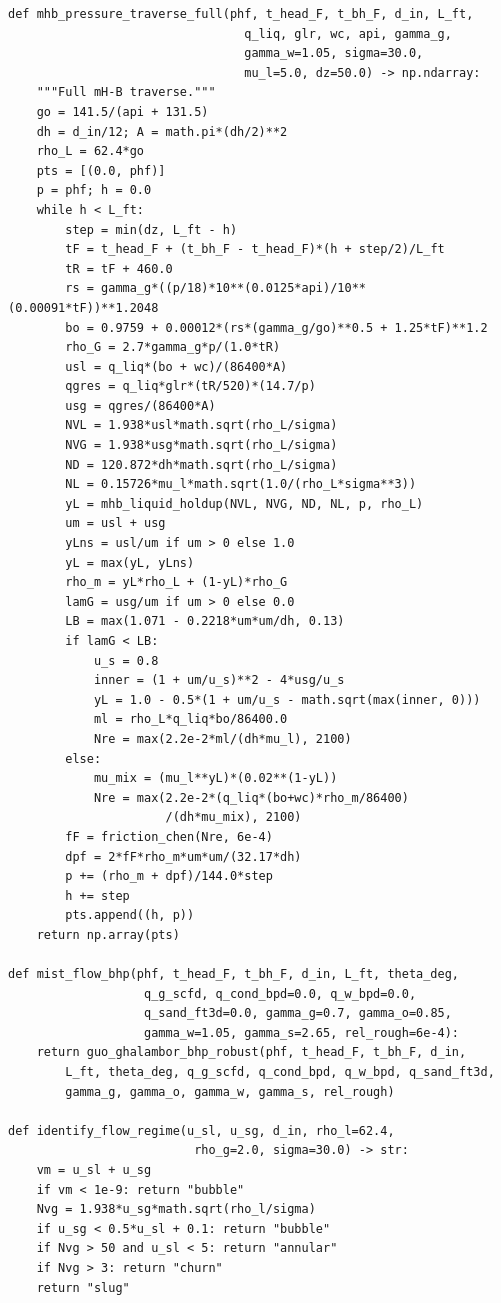 \documentclass[10pt,a4paper,openany]{book}
\begin{document}
\begin{lstlisting}
def mhb_pressure_traverse_full(phf, t_head_F, t_bh_F, d_in, L_ft,
                                 q_liq, glr, wc, api, gamma_g,
                                 gamma_w=1.05, sigma=30.0,
                                 mu_l=5.0, dz=50.0) -> np.ndarray:
    """Full mH-B traverse."""
    go = 141.5/(api + 131.5)
    dh = d_in/12; A = math.pi*(dh/2)**2
    rho_L = 62.4*go
    pts = [(0.0, phf)]
    p = phf; h = 0.0
    while h < L_ft:
        step = min(dz, L_ft - h)
        tF = t_head_F + (t_bh_F - t_head_F)*(h + step/2)/L_ft
        tR = tF + 460.0
        rs = gamma_g*((p/18)*10**(0.0125*api)/10**(0.00091*tF))**1.2048
        bo = 0.9759 + 0.00012*(rs*(gamma_g/go)**0.5 + 1.25*tF)**1.2
        rho_G = 2.7*gamma_g*p/(1.0*tR)
        usl = q_liq*(bo + wc)/(86400*A)
        qgres = q_liq*glr*(tR/520)*(14.7/p)
        usg = qgres/(86400*A)
        NVL = 1.938*usl*math.sqrt(rho_L/sigma)
        NVG = 1.938*usg*math.sqrt(rho_L/sigma)
        ND = 120.872*dh*math.sqrt(rho_L/sigma)
        NL = 0.15726*mu_l*math.sqrt(1.0/(rho_L*sigma**3))
        yL = mhb_liquid_holdup(NVL, NVG, ND, NL, p, rho_L)
        um = usl + usg
        yLns = usl/um if um > 0 else 1.0
        yL = max(yL, yLns)
        rho_m = yL*rho_L + (1-yL)*rho_G
        lamG = usg/um if um > 0 else 0.0
        LB = max(1.071 - 0.2218*um*um/dh, 0.13)
        if lamG < LB:
            u_s = 0.8
            inner = (1 + um/u_s)**2 - 4*usg/u_s
            yL = 1.0 - 0.5*(1 + um/u_s - math.sqrt(max(inner, 0)))
            ml = rho_L*q_liq*bo/86400.0
            Nre = max(2.2e-2*ml/(dh*mu_l), 2100)
        else:
            mu_mix = (mu_l**yL)*(0.02**(1-yL))
            Nre = max(2.2e-2*(q_liq*(bo+wc)*rho_m/86400)
                      /(dh*mu_mix), 2100)
        fF = friction_chen(Nre, 6e-4)
        dpf = 2*fF*rho_m*um*um/(32.17*dh)
        p += (rho_m + dpf)/144.0*step
        h += step
        pts.append((h, p))
    return np.array(pts)

def mist_flow_bhp(phf, t_head_F, t_bh_F, d_in, L_ft, theta_deg,
                   q_g_scfd, q_cond_bpd=0.0, q_w_bpd=0.0,
                   q_sand_ft3d=0.0, gamma_g=0.7, gamma_o=0.85,
                   gamma_w=1.05, gamma_s=2.65, rel_rough=6e-4):
    return guo_ghalambor_bhp_robust(phf, t_head_F, t_bh_F, d_in,
        L_ft, theta_deg, q_g_scfd, q_cond_bpd, q_w_bpd, q_sand_ft3d,
        gamma_g, gamma_o, gamma_w, gamma_s, rel_rough)

def identify_flow_regime(u_sl, u_sg, d_in, rho_l=62.4,
                          rho_g=2.0, sigma=30.0) -> str:
    vm = u_sl + u_sg
    if vm < 1e-9: return "bubble"
    Nvg = 1.938*u_sg*math.sqrt(rho_l/sigma)
    if u_sg < 0.5*u_sl + 0.1: return "bubble"
    if Nvg > 50 and u_sl < 5: return "annular"
    if Nvg > 3: return "churn"
    return "slug"
\end{lstlisting}
\end{document}

